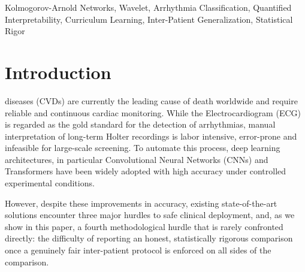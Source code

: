 \documentclass[journal,twoside,web]{ieeecolor}
\begin{document}
\begin{IEEEkeywords}
Kolmogorov-Arnold Networks, Wavelet, Arrhythmia Classification, Quantified Interpretability, Curriculum Learning, Inter-Patient Generalization, Statistical Rigor
\end{IEEEkeywords}

\section{Introduction}

 diseases (CVDs) are currently the leading cause of death worldwide and require reliable and continuous cardiac monitoring. While the Electrocardiogram (ECG) is regarded as the gold standard for the detection of arrhythmias, manual interpretation of long-term Holter recordings is labor intensive, error-prone and infeasible for large-scale screening. To automate this process, deep learning architectures, in particular Convolutional Neural Networks (CNNs) \cite{takalo-mattila_inter-patient_2018, guo_inter-patient_2019} and Transformers \cite{akan_ecgformer_2024} have been widely adopted with high accuracy under controlled experimental conditions.

However, despite these improvements in accuracy, existing state-of-the-art solutions encounter three major hurdles to safe clinical deployment, and, as we show in this paper, a fourth methodological hurdle that is rarely confronted directly: the difficulty of reporting an honest, statistically rigorous comparison once a genuinely fair inter-patient protocol is enforced on all sides of the comparison.
\end{document}
